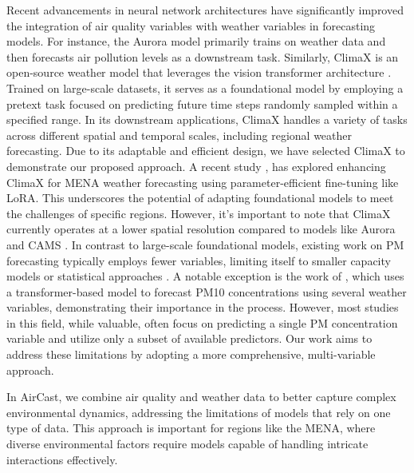 Recent advancements in neural network architectures have significantly improved the integration of air quality variables with weather variables in forecasting models. 
For instance, the Aurora model \citep{bodnar2024aurora} primarily trains on weather data and then forecasts air pollution levels as a downstream task.
Similarly, ClimaX \citep{nguyen2023climaxfoundationmodelweather} is an open-source weather model that leverages the vision transformer architecture \citep{dosovitskiy2021imageworth16x16words}. 
Trained on large-scale datasets, it serves as a foundational model by employing a pretext task focused on predicting future time steps randomly sampled within a specified range. 
In its downstream applications, ClimaX handles a variety of tasks across different spatial and temporal scales, including regional weather forecasting. Due to its adaptable and efficient design, we have selected ClimaX to demonstrate our proposed approach. 
A recent study \citep{munir2024efficient}, has explored enhancing ClimaX for MENA weather forecasting using parameter-efficient fine-tuning like LoRA. This underscores the potential of adapting foundational models to meet the challenges of specific regions.
However, it's important to note that ClimaX currently operates at a lower spatial resolution compared to models like Aurora \citep{bodnar2024aurora} and CAMS \citep{CAMS23}. In contrast to large-scale foundational models, existing work on PM forecasting typically employs fewer variables, limiting itself to smaller capacity models or statistical approaches \citep{CabelloTorres2022, Masood2023-mc}. A notable exception is the work of \cite{Sarafian2023-mx}, which uses a transformer-based model to forecast PM10 concentrations using several weather variables, demonstrating their importance in the process. However, most studies in this field, while valuable, often focus on predicting a single PM concentration variable and utilize only a subset of available predictors. Our work aims to address these limitations by adopting a more comprehensive, multi-variable approach.

In AirCast, we combine air quality and weather data to better capture complex environmental dynamics, addressing the limitations of models that rely on one type of data. This approach is important for regions like the MENA, where diverse environmental factors require models capable of handling intricate interactions effectively.

